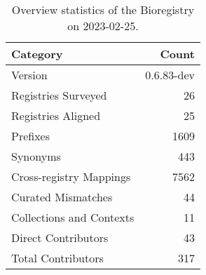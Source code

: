 \begin{table}
\centering
\caption{Overview statistics of the Bioregistry on 2023-02-25.}
\label{tab:bioregistry-summary}
\begin{tabular}{lr}
\toprule
                Category &      Count \\
\midrule
                 Version & 0.6.83-dev \\
     Registries Surveyed &         26 \\
      Registries Aligned &         25 \\
                Prefixes &       1609 \\
                Synonyms &        443 \\
 Cross-registry Mappings &       7562 \\
      Curated Mismatches &         44 \\
Collections and Contexts &         11 \\
     Direct Contributors &         43 \\
      Total Contributors &        317 \\
\bottomrule
\end{tabular}
\end{table}
